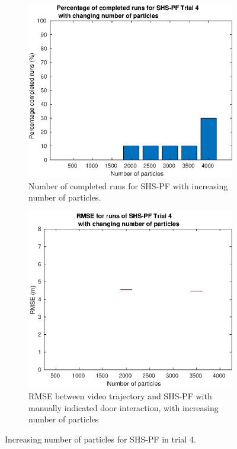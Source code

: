 \begin{figure}[H]
	\centering
	\begin{subfigure}[t]{.4\textwidth}
		\centering
		\includegraphics[width=\linewidth]{images/20201201_1625_Trial_4_nr_particles_1}
		\caption{Number of completed runs for SHS-PF with increasing number of particles.}
		\label{fig:trial4_nr_particles_completed}
	\end{subfigure} \quad
	\begin{subfigure}[t]{.4\textwidth}
		\centering
		\includegraphics[width=\linewidth]{images/20201201_1622_Trial_4_RMSE_nr_particles_1}
		\caption{RMSE between video trajectory and SHS-PF with manually indicated door interaction, with increasing number of particles}
		\label{fig:trial4_nr_particles_RMSE}
	\end{subfigure}
	\label{fig:trial4_nr_particles}
	\caption{Increasing number of particles for SHS-PF in trial 4.}
\end{figure}


